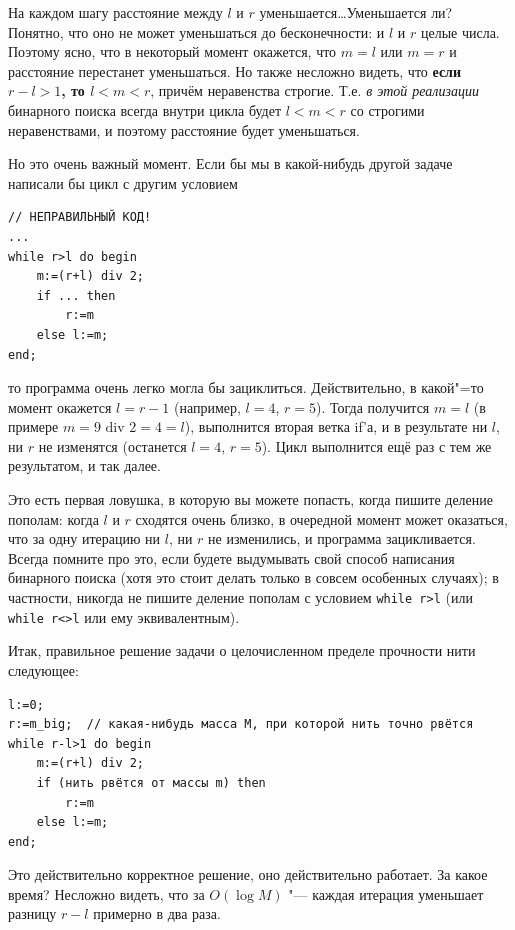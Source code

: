 \documentclass[a4paper,10pt]{problems}
\begin{document}
На каждом шагу расстояние между $l$ и $r$ уменьшается\dots Уменьшается ли?
Понятно, что оно не может уменьшаться до бесконечности: и $l$ и $r$ целые числа.
Поэтому ясно, что в некоторый момент окажется, что $m=l$ или $m=r$ и расстояние перестанет уменьшаться.
Но также несложно видеть, что \textbf{если $r-l>1$, то $l<m<r$}, причём неравенства строгие. 
Т.е. \textit{в этой реализации} бинарного поиска всегда внутри цикла будет $l<m<r$ со строгими неравенствами,
и поэтому расстояние будет уменьшаться.

Но это очень важный момент. Если бы мы в какой-нибудь другой задаче написали бы цикл с другим условием
\begin{codesampleo}\begin{verbatim}
// НЕПРАВИЛЬНЫЙ КОД!
...
while r>l do begin    
    m:=(r+l) div 2;
    if ... then
        r:=m
    else l:=m;
end;
\end{verbatim}
\end{codesampleo}
то программа очень легко могла бы зациклиться. Действительно, в какой"=то момент окажется $l=r-1$ (например, $l=4$, $r=5$).
Тогда получится $m=l$ (в примере $m=9\mbox{ div } 2=4=l$), выполнится вторая ветка if'а, и в результате ни $l$, ни $r$ не изменятся
(останется $l=4$, $r=5$). Цикл выполнится ещё раз с тем же результатом, и так далее.

Это есть первая ловушка, в которую вы можете попасть, когда пишите деление пополам: когда $l$ и $r$ сходятся очень близко, 
в очередной момент может оказаться, что за одну итерацию ни $l$, ни $r$ не изменились, и программа зацикливается.
Всегда помните про это, если будете выдумывать свой способ написания бинарного поиска (хотя это стоит делать только в совсем особенных случаях);
в частности, никогда не пишите деление пополам с условием \verb`while r>l` (или \verb`while r<>l` или ему эквивалентным).

Итак, правильное решение задачи о целочисленном пределе прочности нити следующее:
\begin{codesampleo}\begin{verbatim}
l:=0;
r:=m_big;  // какая-нибудь масса M, при которой нить точно рвётся
while r-l>1 do begin    
    m:=(r+l) div 2;
    if (нить рвётся от массы m) then
        r:=m
    else l:=m;
end;
\end{verbatim}
\end{codesampleo}

Это действительно корректное решение, оно действительно работает. За какое время? 
Несложно видеть, что за $O(\log M)$ "--- каждая итерация уменьшает разницу $r-l$ примерно в два раза.
\end{document}
